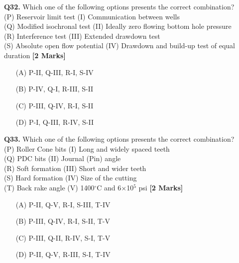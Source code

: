\documentclass[11pt]{article}
\newcommand{\questionb}[2]{
    \noindent\textbf{Q#2.} #1 \hfill \textbf{[2 Marks]}
}
\begin{document}
\questionb{Which one of the following options presents the correct combination? \\
(P) Reservoir limit test \hspace{0.5cm} (I) Communication between wells \\
(Q) Modified isochronal test \hspace{0.5cm} (II) Ideally zero flowing bottom hole pressure \\
(R) Interference test \hspace{1.6cm} (III) Extended drawdown test \\
(S) Absolute open flow potential \hspace{0.35cm} (IV) Drawdown and build-up test of equal duration}{32}
\begin{enumerate}
    \item[(A)] P-II, Q-III, R-I, S-IV  
    \item[(B)] P-IV, Q-I, R-III, S-II  
    \item[(C)] P-III, Q-IV, R-I, S-II  
    \item[(D)] P-I, Q-III, R-IV, S-II  
\end{enumerate}
\vspace{0.5cm}

\questionb{Which one of the following options presents the correct combination? \\
(P) Roller Cone bits \hspace{1.5cm} (I) Long and widely spaced teeth \\
(Q) PDC bits \hspace{2.7cm} (II) Journal (Pin) angle \\
(R) Soft formation \hspace{2.0cm} (III) Short and wider teeth \\
(S) Hard formation \hspace{1.6cm} (IV) Size of the cutting \\
(T) Back rake angle \hspace{2.0cm} (V) 1400\(^\circ\)C and 6×10\(^5\) psi}{33}
\begin{enumerate}
    \item[(A)] P-II, Q-V, R-I, S-III, T-IV  
    \item[(B)] P-III, Q-IV, R-I, S-II, T-V  
    \item[(C)] P-III, Q-II, R-IV, S-I, T-V  
    \item[(D)] P-II, Q-V, R-III, S-I, T-IV  
\end{enumerate}
\vspace{0.5cm}
\end{document}
